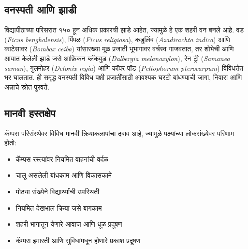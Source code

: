 \documentclass[a4paper,12pt,landscape]{memoir}
\newcommand{\introsection}[2]{%
  \begin{minipage}[t]{0.48\textwidth}
    \begin{mdframed}[
      linecolor=headingcolor,
      linewidth=1pt,
      roundcorner=5pt,
      leftmargin=0pt,
      rightmargin=0pt,
      backgroundcolor=headingcolor!5
    ]
      #1
    \end{mdframed}
  \end{minipage}\hfill
  \begin{minipage}[t]{0.48\textwidth}
    \begin{mdframed}[
      linecolor=headingcolor,
      linewidth=1pt,
      roundcorner=5pt,
      leftmargin=0pt,
      rightmargin=0pt,
      backgroundcolor=headingcolor!5
    ]
      #2
    \end{mdframed}
  \end{minipage}
  \newpage
}
\begin{document}
\introsection{%
  \section*{\textbf{वनस्पती आणि झाडी}}
  विद्यापीठाच्या परिसरात १५० हून अधिक प्रकारची झाडे आहेत, ज्यामुळे हे एक शहरी वन बनले आहे. 
  वड ({\latintext \textit{Ficus benghalensis}}), पिंपळ ({\latintext \textit{Ficus religiosa}}), 
  कडुलिंब ({\latintext\textit{Azadirachta indica}}) आणि काटेसावर  ({\latintext \textit{Bombax ceiba}}) 
  यांसारख्या मूळ प्रजाती भूभागावर वर्चस्व गाजवतात, तर शोभेची आणि आयात केलेली झाडे जसे आफ्रिकन ब्लॅकवुड 
  ({\latintext \textit{Dalbergia melanoxylon}}), रेन ट्री ({\latintext{}\textit{Samanea saman}}), गुलमोहर ({\latintext\textit{Delonix regia}}) 
  आणि कॉपर पॉड ({\latintext \textit{Peltophorum pterocarpum}}) विविधतेत भर घालतात. ही समृद्ध वनस्पती विविध पक्षी प्रजातींसाठी आवश्यक घरटी बांधण्याची जागा, 
  निवारा आणि अन्नाचे स्रोत पुरवते.
}{%
  \section*{\textbf{मानवी हस्तक्षेप}}
  कॅम्पस परिसंस्थेवर विविध मानवी क्रियाकलापांचा दबाव आहे, ज्यामुळे पक्ष्यांच्या लोकसंख्येवर परिणाम होतो:
  \begin{itemize}
  \item कॅम्पस रस्त्यांवर नियमित वाहनांची वर्दळ
  \item चालू असलेली बांधकाम आणि विकासकामे
  \item मोठ्या संख्येने विद्यार्थ्यांची उपस्थिती
  \item नियमित देखभाल क्रिया जसे बागकाम
  \item शहरी भागातून येणारे आवाज आणि धूळ प्रदूषण
  \item कॅम्पस इमारती आणि सुविधांमधून होणारे प्रकाश प्रदूषण
  \end{itemize}
}
\end{document}
